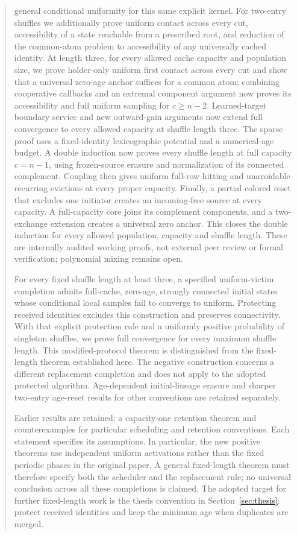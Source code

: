 \documentclass[11pt]{article}
\begin{document}
\begin{abstract}
general conditional uniformity for this same explicit kernel.
For two-entry shuffles we additionally prove uniform contact
across every cut, accessibility of a state reachable from a
prescribed root, and reduction of the common-atom problem to
accessibility of any universally cached identity.
At length three, for every allowed cache capacity and
population size, we prove holder-only uniform first
contact across every cut and show that a
universal zero-age anchor suffices for a common atom;
combining cooperative callbacks and an extremal component
argument now proves its accessibility and full uniform
sampling for $c\ge n-2$. Learned-target boundary service
and new outward-gain arguments now extend full convergence
to every allowed capacity at shuffle length three. The
sparse proof uses a fixed-identity lexicographic potential
and a numerical-age budget. A double induction now proves every
shuffle length at full capacity $c=n-1$, using frozen-source
erasure and normalization of its connected complement. Coupling
then gives uniform full-row hitting and unavoidable recurring
evictions at every proper capacity. Finally, a partial colored reset
that excludes one initiator creates an incoming-free source at every
capacity. A full-capacity core joins its complement components, and
a two-exchange extension creates a universal zero anchor. This closes
the double induction for every allowed population, capacity and shuffle
length. These are internally audited working proofs, not external peer
review or formal verification; polynomial mixing remains open.

For every fixed shuffle length at least three, a specified
uniform-victim completion admits full-cache, zero-age, strongly
connected initial states whose conditional local samples fail
to converge to uniform. Protecting received identities excludes
this construction and preserves connectivity. With that explicit
protection rule and a uniformly positive probability of singleton
shuffles, we prove full convergence for every maximum shuffle
length. This modified-protocol theorem is distinguished from
the fixed-length theorem established here.
The negative construction concerns a different replacement
completion and does not apply to the adopted protected algorithm.
Age-dependent initial-lineage erasure and sharper two-entry
age-reset results for other conventions are retained separately.

Earlier results are retained: a capacity-one retention theorem and
counterexamples for particular scheduling and retention conventions.
Each statement specifies its assumptions. In particular, the new
positive theorems use independent uniform activations rather than the
fixed periodic phases in the original paper. A general fixed-length
theorem must therefore specify both the scheduler and the replacement
rule; no universal conclusion across all these completions is claimed.
The adopted target for further fixed-length work is the thesis
convention in Section~\ref{sec:thesis}: protect received identities
and keep the minimum age when duplicates are merged.
\end{abstract}
\end{document}
